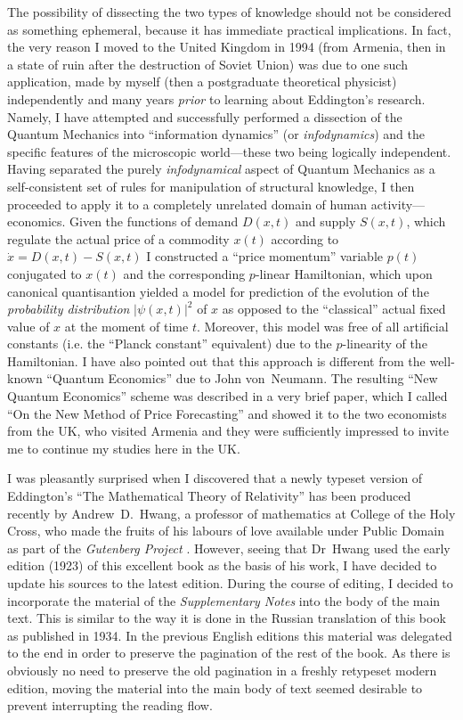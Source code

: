 \documentclass[12pt]{book}
\begin{document}
The possibility of dissecting the two types of knowledge should not be considered as something ephemeral, because it has immediate practical implications.
In fact, the very reason I moved to the United Kingdom in 1994 (from Armenia, then in a state of ruin after the destruction of Soviet Union) was due
to one such application, made by myself (then a postgraduate theoretical physicist) independently and many years \emph{prior} to learning about Eddington's research.
Namely, I have attempted and successfully performed a dissection of the Quantum Mechanics into ``information dynamics'' (or \emph{infodynamics}) and the specific features
of the microscopic world---these two being logically independent.
Having separated the purely \emph{infodynamical} aspect of Quantum Mechanics as a self\hyp{}consistent set of rules for manipulation of structural knowledge, I then proceeded
to apply it to a completely unrelated domain of human activity---economics.
Given the functions of demand $D(x,t)$ and supply $S(x,t)$, which regulate the actual price of a commodity $x(t)$ according to $\dot x = D(x,t) - S(x,t)$ I constructed
a ``price momentum'' variable $p(t)$ conjugated to $x(t)$ and the corresponding $p$-linear Hamiltonian, which upon canonical quantisantion yielded a model for prediction of the evolution
of the \emph{probability distribution} $|\psi(x,t)|^2$ of $x$ as opposed to the ``classical'' actual fixed value of $x$ at the moment of time $t$.
Moreover, this model was free of all artificial constants (i.e. the ``Planck constant'' equivalent) due to the $p$-linearity of the Hamiltonian.
I have also pointed out that this approach is different from the well-known ``Quantum Economics'' due to John von~Neumann.
The resulting ``New Quantum Economics'' scheme was described in a very brief paper, which I called ``On the New Method of Price Forecasting'' and showed it to the two economists from the UK,
who visited Armenia and they were sufficiently impressed to invite me to continue my studies here in the UK.


I was pleasantly surprised when I discovered that a newly typeset version of Eddington's
``The Mathematical Theory of Relativity'' has been produced recently by Andrew~D.~Hwang,
a professor of mathematics at College of the Holy Cross, who made the fruits of his labours of love
available under Public Domain as part of the \emph{Gutenberg Project} \cite{Hwang1}.
However, seeing that Dr~Hwang used the early edition (1923) of this excellent book as the basis of his work,
I have decided to update his sources to the latest edition.
During the course of editing, I decided to incorporate the material of the \emph{Supplementary Notes} into the
body of the main text.
This is similar to the way it is done in the Russian translation of this book as published in 1934.
In the previous English editions this material was delegated to the end in order to preserve the pagination
of the rest of the book.
As there is obviously no need to preserve the old pagination in a freshly retypeset modern edition,
moving the material into the main body of text seemed desirable to prevent interrupting the reading flow.
\end{document}
